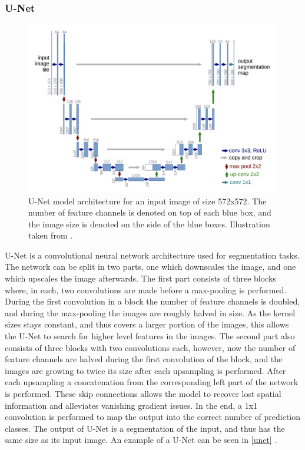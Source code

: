 \subsubsection{U-Net}
\begin{figure}
	\centering
	\includegraphics[width=\linewidth]{Materials/Theory/unet}
	\caption{U-Net model architecture for an input image of size 572x572. The number of feature channels is denoted on top of each blue box, and the image size is denoted on the side of the blue boxes. Illustration taken from \cite{unet}.}
	\label{unet}
\end{figure}

U-Net is a convolutional neural network architecture used for segmentation tasks. The network can be split in two parts, one which downscales the image, and one which upscales the image afterwards. The first part consists of three blocks where, in each, two convolutions are made before a max-pooling is performed. During the first convolution in a block the number of feature channels is doubled, and during the max-pooling the images are roughly halved in size. As the kernel sizes stays constant, and thus covers a larger portion of the images, this allows the U-Net to search for higher level features in the images. The second part also consists of three blocks with two convolutions each, however, now the number of feature channels are halved during the first convolution of the block, and the images are growing to twice its size after each upsampling is performed. After each upsampling a concatenation from the corresponding left part of the network is performed. These skip connections allows the model to recover lost spatial information and alleviates vanishing gradient issues. In the end, a 1x1 convolution is performed to map the output into the correct number of prediction classes. The output of U-Net is a segmentation of the input, and thus has the same size as its input image. An example of a U-Net can be seen in \autoref{unet} \cite{unet}.

